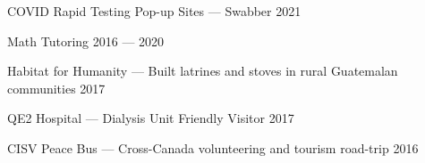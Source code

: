 COVID Rapid Testing Pop-up Sites --- Swabber \hfill 2021

Math Tutoring \hfill 2016 --- 2020

Habitat for Humanity --- Built latrines and stoves in rural Guatemalan communities	\hfill 2017

QE2 Hospital --- Dialysis Unit Friendly Visitor	\hfill 2017

CISV Peace Bus --- Cross-Canada volunteering and tourism road-trip	\hfill 2016
